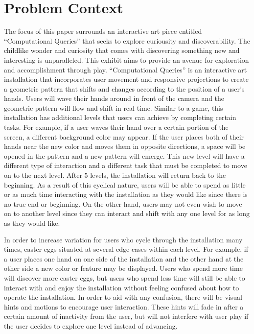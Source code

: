 \documentclass[10pt,twocolumn]{article}
\begin{document}
\section{Problem Context}	
The focus of this paper surrounds an interactive art piece entitled ``Computational Queries'' that seeks to explore curiousity and discoverability.  The childlike wonder and curiosity that comes with discovering something new and interesting is unparalleled. This exhibit aims to provide an avenue for exploration and accomplishment through play.  ``Computational Queries'' is an interactive art installation that incorporates user movement and responsive projections to create a geometric pattern that shifts and changes according to the position of a user's hands.  Users will wave their hands around in front of the camera and the geometric pattern will flow and shift in real time. Similar to a game, this installation has additional levels that users can achieve by completing certain tasks.  For example, if a user waves their hand over a certain portion of the screen, a different background color may appear.  If the user places both of their hands near the new color and moves them in opposite directions, a space will be opened in the pattern and a new pattern will emerge.  This new level will have a different type of interaction and a different task that must be completed to move on to the next level.  After 5 levels, the installation will return back to the beginning.  As a result of this cyclical nature, users will be able to spend as little or as much time interacting with the installation as they would like since there is no true end or beginning. On the other hand, users may not even wish to move on to another level since they can interact and shift with any one level for as long as they would like.  

In order to increase variation for users who cycle through the installation many times, easter eggs situated at several edge cases within each level.  For example, if a user places one hand on one side of the installation and the other hand at the other side a new color or feature may be displayed.  Users who spend more time will discover more easter eggs, but users who spend less time will still be able to interact with and enjoy the installation without feeling confused about how to operate the installation.  In order to aid with any confusion, there will be visual hints and motions to encourage user interaction. These hints will fade in after a certain amount of inactivity from the user, but will not interfere with user play if the user decides to explore one level instead of advancing. 
\end{document}
